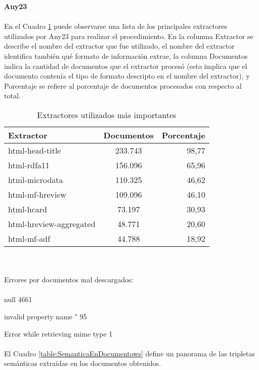 \noindent\textbf{Any23}
\\\\
En el Cuadro \ref{table:Extractors} puede observarse una lista de los principales extractores utilizados por Any23 para realizar el 
procedimiento. En la columna Extractor se describe el nombre del extractor que fue utilizado, el nombre del extractor identifica también qué formato de 
información extrae, la columna Documentos indica la cantidad de documentos que el extractor procesó (esto implica que el documento contenía el tipo de formato descripto en el nombre del extractor), y 
Porcentaje se refiere al porcentaje de documentos procesados con respecto al total.
\begin{table}[h]
\begin{tabular}{| l | c | r | }\hline
Extractor & Documentos & Porcentaje \\\hline
html-head-title & 233.743 & 98,77 \\    
html-rdfa11 & 156.096 & 65,96 \\
html-microdata & 110.325 & 46,62 \\    
html-mf-hreview & 109.096 & 46,10 \\
html-hcard & 73.197 & 30,93  \\
html-hreview-aggregated & 48.771 & 20,60 \\
html-mf-adf & 44.788 & 18,92 \\\hline
 \end{tabular}
\caption{Extractores utilizados más importantes}
\label{table:Extractors}
\end{table}
\\
\\
Errores por documentos mal descargados:
\\\\
null 4661

\noindent invalid property name " 95

\noindent Error while retrieving mime type 1
\\ 
\\ 
El Cuadro \ref{table:SemanticaEnDocumentows} define un panorama de las tripletas semánticas extraídas en los documentos obtenidos.

